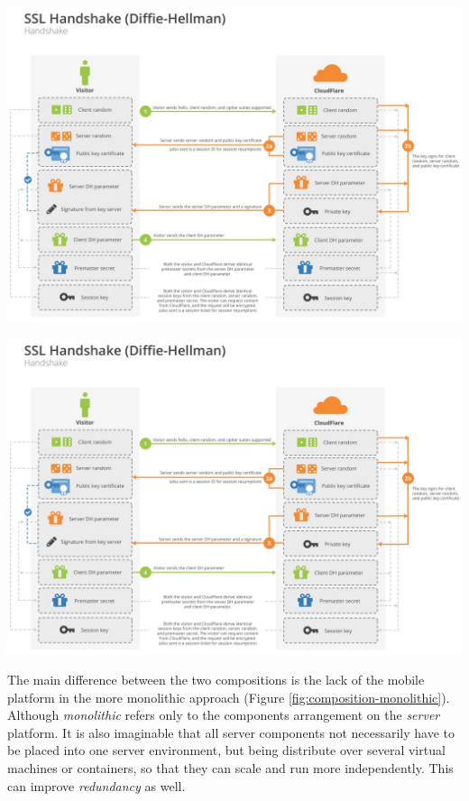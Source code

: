 \documentclass[12pt,english,a4paper,titlepage,cleardoublepage=empty,dottedtoc]{report}
\let\origfigure=\figure
\let\endorigfigure=\endfigure
\renewenvironment{figure}[1][]{%
\origfigure[b]
}{%
\endorigfigure
}
\begin{document}
\begin{figure}
\centering
\includegraphics{./assets/figures/TODO_pdaas_component-composition_monolithic.jpg}
\caption{PDaaS Architecture, monolithic
composition\label{fig:composition-monolithic}}
\end{figure}

\begin{figure}
\centering
\includegraphics{./assets/figures/TODO_pdaas_component-composition_distributed.jpg}
\caption{PDaaS Architecture, distributed
composition\label{fig:composition-distributed}}
\end{figure}

The main difference between the two compositions is the lack of the
mobile platform in the more monolithic approach (Figure
\ref{fig:composition-monolithic}). Although \emph{monolithic} refers
only to the components arrangement on the \emph{server} platform. It is
also imaginable that all server components not necessarily have to be
placed into one server environment, but being distribute over several
virtual machines or containers, so that they can scale and run more
independently. This can improve \emph{redundancy} as well.
\end{document}
